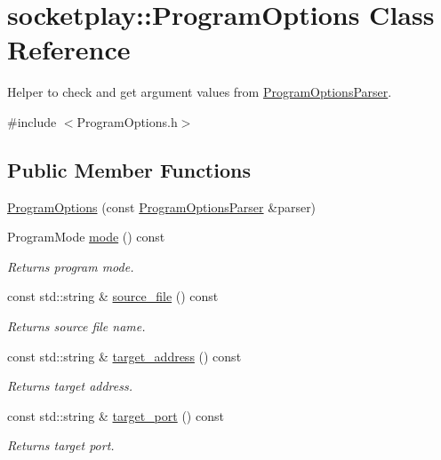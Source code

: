 \hypertarget{classsocketplay_1_1ProgramOptions}{}\section{socketplay\+:\+:Program\+Options Class Reference}
\label{classsocketplay_1_1ProgramOptions}


Helper to check and get argument values from \hyperlink{classsocketplay_1_1ProgramOptionsParser}{Program\+Options\+Parser}.  




{\ttfamily \#include $<$Program\+Options.\+h$>$}

\subsection*{Public Member Functions}
\begin{DoxyCompactItemize}
\item 
\hyperlink{classsocketplay_1_1ProgramOptions_a34efe437f5d969ba668e2be5559db534}{Program\+Options} (const \hyperlink{classsocketplay_1_1ProgramOptionsParser}{Program\+Options\+Parser} \&parser)
\item 
Program\+Mode \hyperlink{classsocketplay_1_1ProgramOptions_a0d13c01510cea126672382bbd0058b81}{mode} () const \hypertarget{classsocketplay_1_1ProgramOptions_a0d13c01510cea126672382bbd0058b81}{}\label{classsocketplay_1_1ProgramOptions_a0d13c01510cea126672382bbd0058b81}

\begin{DoxyCompactList}\small\item\em Returns program mode. \end{DoxyCompactList}\item 
const std\+::string \& \hyperlink{classsocketplay_1_1ProgramOptions_ad6e2a11e5dae0d8621fc38d1cddc6f7c}{source\+\_\+file} () const 
\begin{DoxyCompactList}\small\item\em Returns source file name. \end{DoxyCompactList}\item 
const std\+::string \& \hyperlink{classsocketplay_1_1ProgramOptions_a92c4779f7f597eb1fb77143f72491197}{target\+\_\+address} () const 
\begin{DoxyCompactList}\small\item\em Returns target address. \end{DoxyCompactList}\item 
const std\+::string \& \hyperlink{classsocketplay_1_1ProgramOptions_a4c47d43affa63f456694a0fcfa1d6dc0}{target\+\_\+port} () const 
\begin{DoxyCompactList}\small\item\em Returns target port. \end{DoxyCompactList}\end{DoxyCompactItemize}


